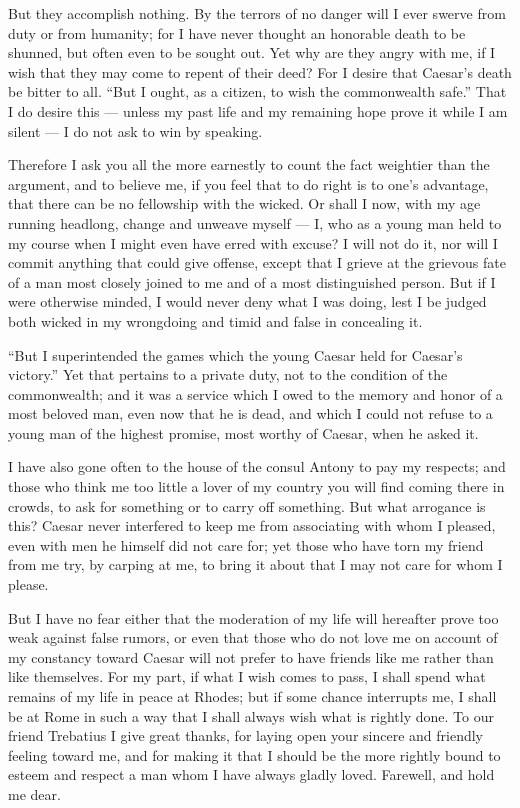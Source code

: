  But they accomplish nothing. By the terrors of no danger will I ever swerve from duty or from humanity; for I have never thought an honorable death to be shunned, but often even to be sought out. Yet why are they angry with me, if I wish that they may come to repent of their deed? For I desire that Caesar's death be bitter to all. ``But I ought, as a citizen, to wish the commonwealth safe.'' That I do desire this --- unless my past life and my remaining hope prove it while I am silent --- I do not ask to win by speaking.

 Therefore I ask you all the more earnestly to count the fact weightier than the argument, and to believe me, if you feel that to do right is to one's advantage, that there can be no fellowship with the wicked. Or shall I now, with my age running headlong, change and unweave myself --- I, who as a young man held to my course when I might even have erred with excuse? I will not do it, nor will I commit anything that could give offense, except that I grieve at the grievous fate of a man most closely joined to me and of a most distinguished person. But if I were otherwise minded, I would never deny what I was doing, lest I be judged both wicked in my wrongdoing and timid and false in concealing it.

 ``But I superintended the games which the young Caesar held for Caesar's victory.'' Yet that pertains to a private duty, not to the condition of the commonwealth; and it was a service which I owed to the memory and honor of a most beloved man, even now that he is dead, and which I could not refuse to a young man of the highest promise, most worthy of Caesar, when he asked it.

 I have also gone often to the house of the consul Antony to pay my respects; and those who think me too little a lover of my country you will find coming there in crowds, to ask for something or to carry off something. But what arrogance is this? Caesar never interfered to keep me from associating with whom I pleased, even with men he himself did not care for; yet those who have torn my friend from me try, by carping at me, to bring it about that I may not care for whom I please.

 But I have no fear either that the moderation of my life will hereafter prove too weak against false rumors, or even that those who do not love me on account of my constancy toward Caesar will not prefer to have friends like me rather than like themselves. For my part, if what I wish comes to pass, I shall spend what remains of my life in peace at Rhodes; but if some chance interrupts me, I shall be at Rome in such a way that I shall always wish what is rightly done. To our friend Trebatius I give great thanks, for laying open your sincere and friendly feeling toward me, and for making it that I should be the more rightly bound to esteem and respect a man whom I have always gladly loved. Farewell, and hold me dear.
